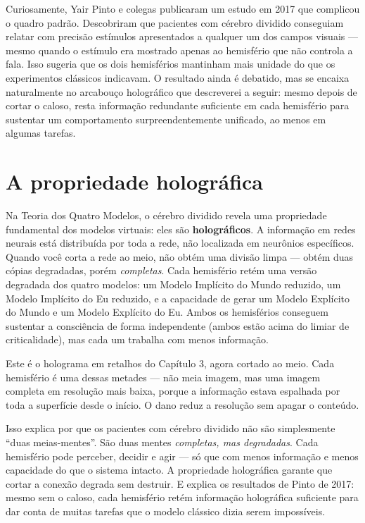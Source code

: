 \documentclass[11pt, twoside, openright]{book}
\begin{document}
Curiosamente, Yair Pinto e colegas publicaram um estudo em 2017 que complicou o quadro padrão. Descobriram que pacientes com cérebro dividido conseguiam relatar com precisão estímulos apresentados a qualquer um dos campos visuais --- mesmo quando o estímulo era mostrado apenas ao hemisfério que não controla a fala. Isso sugeria que os dois hemisférios mantinham mais unidade do que os experimentos clássicos indicavam. O resultado ainda é debatido, mas se encaixa naturalmente no arcabouço holográfico que descreverei a seguir: mesmo depois de cortar o caloso, resta informação redundante suficiente em cada hemisfério para sustentar um comportamento surpreendentemente unificado, ao menos em algumas tarefas.

\section*{A propriedade holográfica}

Na Teoria dos Quatro Modelos, o cérebro dividido revela uma propriedade fundamental dos modelos virtuais: eles são \textbf{holográficos}. A informação em redes neurais está distribuída por toda a rede, não localizada em neurônios específicos. Quando você corta a rede ao meio, não obtém uma divisão limpa --- obtém duas cópias degradadas, porém \textit{completas}. Cada hemisfério retém uma versão degradada dos quatro modelos: um Modelo Implícito do Mundo reduzido, um Modelo Implícito do Eu reduzido, e a capacidade de gerar um Modelo Explícito do Mundo e um Modelo Explícito do Eu. Ambos os hemisférios conseguem sustentar a consciência de forma independente (ambos estão acima do limiar de criticalidade), mas cada um trabalha com menos informação.

Este é o holograma em retalhos do Capítulo 3, agora cortado ao meio. Cada hemisfério é uma dessas metades --- não meia imagem, mas uma imagem completa em resolução mais baixa, porque a informação estava espalhada por toda a superfície desde o início. O dano reduz a resolução sem apagar o conteúdo.

Isso explica por que os pacientes com cérebro dividido não são simplesmente ``duas meias-mentes''. São duas mentes \textit{completas, mas degradadas}. Cada hemisfério pode perceber, decidir e agir --- só que com menos informação e menos capacidade do que o sistema intacto. A propriedade holográfica garante que cortar a conexão degrada sem destruir. E explica os resultados de Pinto de 2017: mesmo sem o caloso, cada hemisfério retém informação holográfica suficiente para dar conta de muitas tarefas que o modelo clássico dizia serem impossíveis.
\end{document}
